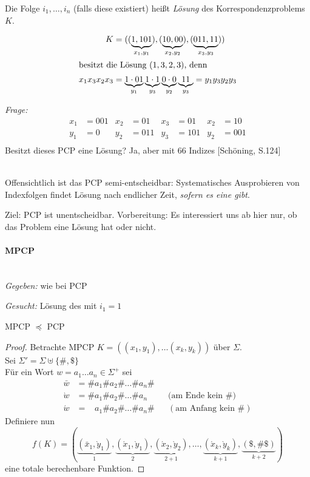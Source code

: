 {Die Folge $i_1, \dots, i_n$ (falls diese existiert) heißt \emph{Lösung} des Korrespondenzproblems $K$.
\begin{Bsp*}
\begin{align*}
	K &=((\underbrace{1,101}_{x_1, y_1}), (\underbrace{10, 00}_{x_2, y_2}), (\underbrace{011, 11}_{x_3, y_3}))\\
\shortintertext{besitzt die Lösung $(1,3,2,3)$, denn}
	x_1 x_3 x_2 x_3 &= \underbrace{1 \cdot 01}_{y_1}\underbrace{1 \cdot 1}_{y_3}\underbrace{0 \cdot 0}_{y_2}\underbrace{11}_{y_3} = y_1 y_3 y_2 y_3
\end{align*}
\end{Bsp*}\vspace{-1em}
\emph{Frage:}
\begin{align*}
  x_1&=001 & x_2&=01 & x_3&=01 & x_2&=10\\
  y_1&=0  & y_2&=011 & y_3&=101  & y_2&=001\\
\end{align*}
Besitzt dieses \ac{PCP} eine Lösung? Ja, aber mit $66$ Indizes [Schöning, S.124]
\begin{Bemerkung}\ \\
  Offensichtlich ist das \ac{PCP} semi-entscheidbar: Systematisches
  Ausprobieren von Indexfolgen findet Lösung nach endlicher Zeit,
  \emph{sofern es eine gibt}.
\end{Bemerkung}
Ziel: \ac{PCP} ist unentscheidbar. Vorbereitung:
Es interessiert uns ab hier nur, ob das Problem eine Lösung hat oder nicht.
\paragraph[\acf*{MPCP}]{\acf{MPCP}}\ \\
\emph{Gegeben:} wie bei \ac{PCP}

\emph{Gesucht:} Lösung des  mit $i_1=1$
\begin{lemma}[name={[MPCP $\preceq$ PCP]}]
    \ac{MPCP} $\preceq$ \ac{PCP}
\end{lemma}
\begin{proof}
	Betrachte \ac{MPCP} $K=((x_1,y_1),\dots(x_k,y_k))$ über $\Sigma$.\\
	Sei $\Sigma'=\Sigma\uplus\{\#,\$\}$ \\
	Für ein Wort $w=a_1\dots a_n\in\Sigma^+$ sei
	\begin{align*}
		\bar w &= \#a_1\#a_2\#\dots\#a_n\#\\
		\grave w &= \#a_1\#a_2\#\dots\#a_n &&\text{(am Ende kein \#)}\\
		\acute w &= \phantom{\#}a_1\#a_2\#\dots\#a_n\# &&(\text{am Anfang kein }\#)
	\end{align*}
	Definiere nun
	\[ f(K) = (\underbrace{(\bar x_1,\grave y_1)}_1, \underbrace{(\acute x_1, \grave y_1)}_2, \underbrace{(\acute x_2,\grave y_2)}_{2+1}, \dots, \underbrace{(\acute x_k,\grave y_k)}_{k+1}, \underbrace{(\$,\#\$)}_{k+2}) \]
	eine totale berechenbare Funktion.
	

\end{proof}}
